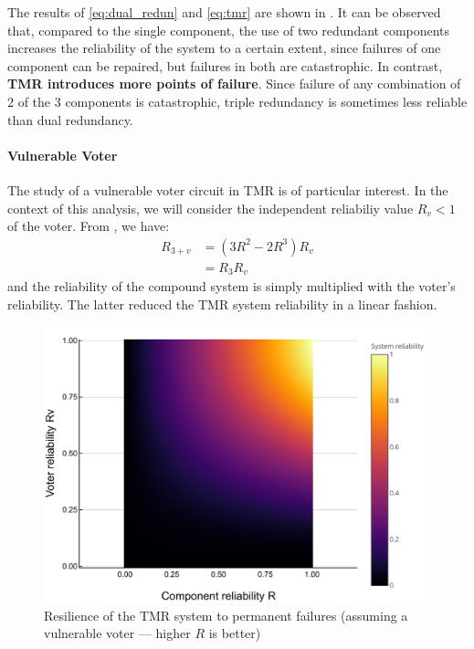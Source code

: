 \documentclass[a4paper,nobib]{tufte-book}
\def\acusepage#1{}
\begin{document}
The results of \eqref{eq:dual_redun} and \eqref{eq:tmr} are shown in . It can be observed that, compared to the single component, the use of two redundant components increases the reliability of the system to a certain extent, since failures of one component can be repaired, but failures in both are catastrophic. In contrast, \textbf{\acs{TMR} introduces more points of failure}. Since failure of any combination of 2 of the 3 components is catastrophic, triple redundancy is sometimes less reliable than dual redundancy.

\paragraph{\textbf{Vulnerable Voter}}\hspace{0pt}
\acusepage{voter}

The study of a vulnerable voter circuit in \acs{TMR} is of particular interest. In the context of this analysis, we will consider the independent reliabiliy value \( R_v < 1 \) of the voter. From \autocite[31]{birolini_reliability_engineering_2004}, we have:
\begin{align}
R_{3+v} &= (3R^2 - 2R^3)R_v \\
&= R_3R_v
\end{align}
and the reliability of the compound system is simply multiplied with the voter's reliability. The latter reduced the \acs{TMR} system reliability in a linear fashion.

\begin{figure}
	\centering
	\includegraphics{analysis/reliability_norepair_voter_en}
	\caption[Resilience of the TMR system to permanent failures (assuming a vulnerable voter)]{Resilience of the \acs{TMR} system to permanent failures (assuming a vulnerable voter --- higher \(R\) is better)}
	\label{fig:reliability_norepair_voter}
\end{figure}
\end{document}
